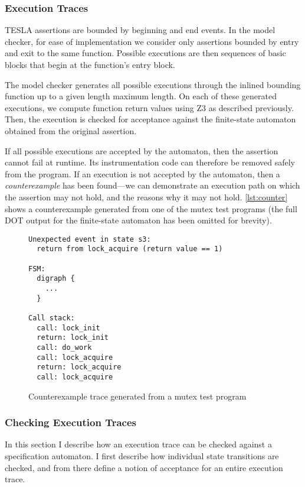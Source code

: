 \subsubsection{Execution Traces}

TESLA assertions are bounded by beginning and end events. In the model checker,
for ease of implementation we consider only assertions bounded by entry and exit
to the same function. Possible executions are then sequences of basic blocks
that begin at the function's entry block.

The model checker generates all possible executions through the inlined bounding
function up to a given length maximum length. On each of these generated
executions, we compute function return values using Z3 as described previously.
Then, the execution is checked for acceptance against the finite-state automaton
obtained from the original assertion.

If all possible executions are accepted by the automaton, then the assertion
cannot fail at runtime. Its instrumentation code can therefore be removed safely
from the program. If an execution is not accepted by the automaton, then a
\emph{counterexample} has been found---we can demonstrate an execution path on
which the assertion may not hold, and the reasons why it may not hold.
\autoref{lst:counter} shows a counterexample generated from one of the mutex
test programs (the full DOT output for the finite-state automaton has been
omitted for brevity).

\begin{figure}
  \begin{verbatim}
Unexpected event in state s3:
  return from lock_acquire (return value == 1)

FSM:
  digraph {
    ...
  }

Call stack:
  call: lock_init
  return: lock_init
  call: do_work
  call: lock_acquire
  return: lock_acquire
  call: lock_acquire
  \end{verbatim}
  \caption{Counterexample trace generated from a mutex test program}
  \label{lst:counter}
\end{figure}

\subsubsection{Checking Execution Traces}

In this section I describe how an execution trace can be checked against a
specification automaton. I first describe how individual state transitions are
checked, and from there define a notion of acceptance for an entire execution
trace.

